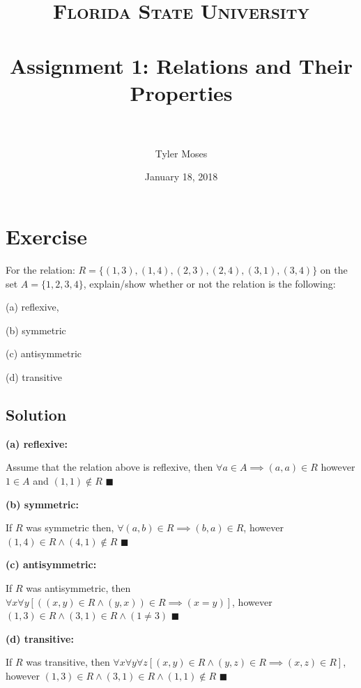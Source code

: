 \documentclass[paper=a4, fontsize=11pt]{scrartcl} %
\title{	
\normalfont \normalsize 
\textsc{Florida State University} \\ [25pt] %
\horrule{0.5pt} \\[0.4cm] %
\huge Assignment 1: Relations and Their Properties \\ %
\horrule{2pt} \\[0.5cm] %
}
\author{Tyler Moses} %
\date{\normalsize January 18, 2018} %
\numberwithin{equation}{section} %
\numberwithin{figure}{section} %
\numberwithin{table}{section} %
\begin{document}
\maketitle %


\section{Exercise}

For the relation: $R = \{(1, 3), (1, 4), (2, 3), (2, 4), (3, 1), (3, 4)\}$ on the set $A=\{1,2,3,4\}$, explain/show whether or not the relation is the following:

(a) reflexive,

(b) symmetric

(c) antisymmetric

(d) transitive

\subsection{Solution}

\textbf{(a) reflexive:} 

Assume that the relation above is reflexive, then $\forall a \in A \implies (a,a) \in R$ however $1 \in A $ and $(1,1) \not\in R$ $\blacksquare$

\textbf{(b) symmetric:} 

If $R$ was symmetric then, $\forall (a,b) \in R \implies (b,a) \in R$, however $(1,4) \in R \land (4,1) \not\in R$ $\blacksquare$

\textbf{(c) antisymmetric:}

If $R$ was antisymmetric, then $\forall x \forall y  [((x,y) \in R \land (y,x)) \in R \implies (x = y)]$, however $(1,3) \in R \land (3,1) \in R \land (1 \neq 3)$  $\blacksquare$

\textbf{(d) transitive:}

If $R$ was transitive, then $\forall x \forall y \forall z [(x,y) \in R \land (y,z) \in R \implies (x,z) \in R]$, however $(1,3) \in R \land (3,1) \in R \land (1,1) \not\in R$ $\blacksquare$

\end{document}
